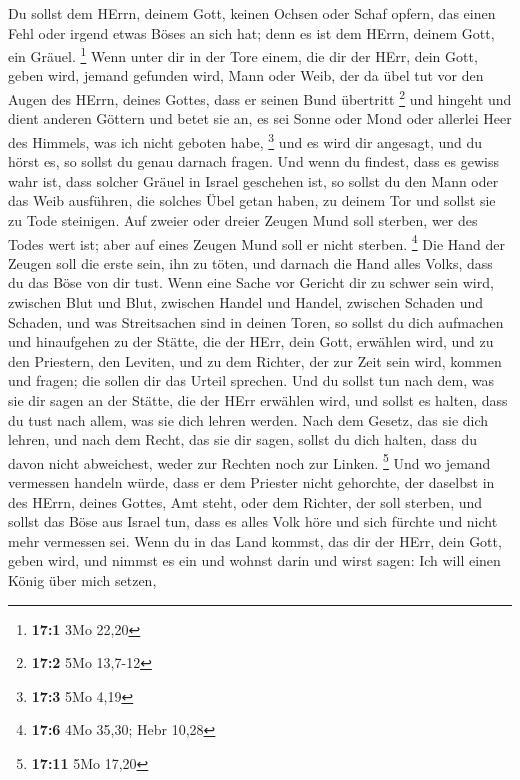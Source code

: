  Du sollst dem HErrn, deinem Gott, keinen Ochsen oder
Schaf opfern, das einen Fehl oder irgend etwas Böses an sich hat; denn
es ist dem HErrn, deinem Gott, ein Gräuel. \footnote{\textbf{17:1} 3Mo
  22,20}  Wenn unter dir in der Tore einem, die dir der
HErr, dein Gott, geben wird, jemand gefunden wird, Mann oder Weib, der
da übel tut vor den Augen des HErrn, deines Gottes, dass er seinen Bund
übertritt \footnote{\textbf{17:2} 5Mo 13,7-12}  und
hingeht und dient anderen Göttern und betet sie an, es sei Sonne oder
Mond oder allerlei Heer des Himmels, was ich nicht geboten habe,
\footnote{\textbf{17:3} 5Mo 4,19}  und es wird dir
angesagt, und du hörst es, so sollst du genau darnach fragen. Und wenn
du findest, dass es gewiss wahr ist, dass solcher Gräuel in Israel
geschehen ist,  so sollst du den Mann oder das Weib
ausführen, die solches Übel getan haben, zu deinem Tor und sollst sie zu
Tode steinigen.  Auf zweier oder dreier Zeugen Mund soll
sterben, wer des Todes wert ist; aber auf eines Zeugen Mund soll er
nicht sterben. \footnote{\textbf{17:6} 4Mo 35,30; Hebr 10,28}
 Die Hand der Zeugen soll die erste sein, ihn zu töten,
und darnach die Hand alles Volks, dass du das Böse von dir tust.
 Wenn eine Sache vor Gericht dir zu schwer sein wird,
zwischen Blut und Blut, zwischen Handel und Handel, zwischen Schaden und
Schaden, und was Streitsachen sind in deinen Toren, so sollst du dich
aufmachen und hinaufgehen zu der Stätte, die der HErr, dein Gott,
erwählen wird,  und zu den Priestern, den Leviten, und zu
dem Richter, der zur Zeit sein wird, kommen und fragen; die sollen dir
das Urteil sprechen.  Und du sollst tun nach dem, was sie
dir sagen an der Stätte, die der HErr erwählen wird, und sollst es
halten, dass du tust nach allem, was sie dich lehren werden.
 Nach dem Gesetz, das sie dich lehren, und nach dem
Recht, das sie dir sagen, sollst du dich halten, dass du davon nicht
abweichest, weder zur Rechten noch zur Linken. \footnote{\textbf{17:11}
  5Mo 17,20}  Und wo jemand vermessen handeln würde, dass
er dem Priester nicht gehorchte, der daselbst in des HErrn, deines
Gottes, Amt steht, oder dem Richter, der soll sterben, und sollst das
Böse aus Israel tun,  dass es alles Volk höre und sich
fürchte und nicht mehr vermessen sei.  Wenn du in das
Land kommst, das dir der HErr, dein Gott, geben wird, und nimmst es ein
und wohnst darin und wirst sagen: Ich will einen König über mich setzen,
